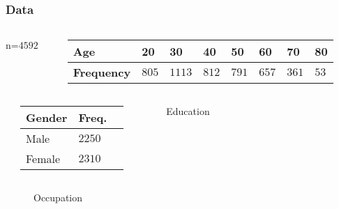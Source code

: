 \documentclass{beamer}              %
\begin{document}
\begin{frame}\label{Data3}
\frametitle{\small Data} 

\vspace{-0.3cm}
      \begin{columns}
        n=$4592$
\begin{table}
\footnotesize
\label{Demographics} 
\begin{tabular}{llllllll} 
\hline
\rowcolor{PaleGreen} \textbf{Age} & 20 & 30 & 40 & 50 & 60 & 70 & 80 \\
 \hline
 \textbf{Frequency}  &$805$ & $1113$ & $812$ & $791$ & $657$ & $361$ & $53$\\
 \hline
\end{tabular}
\end{table}
 \end{columns}

      \begin{columns}
\begin{table}
\footnotesize
\label{Sex} 
\vspace{-0.7cm}
\begin{tabular}{lll} 
\hline
\rowcolor{PaleGreen} \textbf{Gender} & \textbf{Freq.}  \\
 \hline
 Male & $2250$ \\
 Female& $2310$ \\
 \hline
\end{tabular}
\end{table}



         \vspace{-1.1cm}
         \begin{figure}
         \caption*{\footnotesize{\vspace{-0.05cm} Education}}
           \vspace{-0.2cm}
    \end{figure}
      \end{columns}
 



 \begin{figure}
 \vspace{-1.2cm}

 \caption*{\footnotesize{\vspace{-0.2cm}  \hspace{-2cm} Occupation}}
  \hspace{-2.3cm}
  \vspace{-0.55cm}  
\end{figure}
 
\end{frame}
\end{document}
